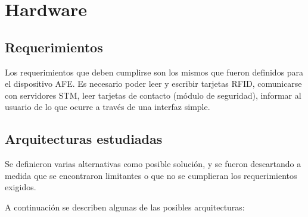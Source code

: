 \chapter{Hardware}

\section{Requerimientos}
Los requerimientos que deben cumplirse son los mismos que fueron definidos para el dispositivo AFE.
Es necesario poder leer y escribir tarjetas RFID, comunicarse con servidores STM, leer tarjetas de contacto (módulo de seguridad), informar al usuario de lo que ocurre a través de una interfaz simple.

\section{Arquitecturas estudiadas}
Se definieron varias alternativas como posible solución, y se fueron descartando a medida que se encontraron limitantes o que no se cumplieran los requerimientos exigidos.

A continuación se describen algunas de las posibles arquitecturas:

